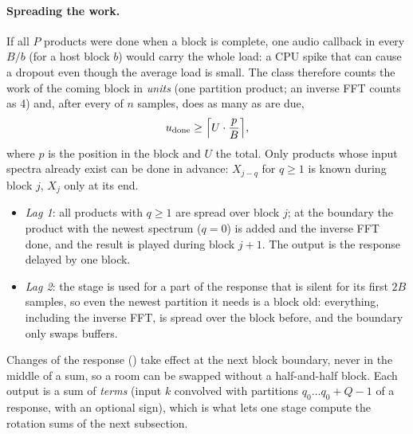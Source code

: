\paragraph{Spreading the work.} If all $P$ products were done when a block is complete, one audio callback in every
$B/b$ (for a host block $b$) would carry the whole load: a CPU spike that can cause a dropout even though the
average load is small. The class therefore counts the work of the coming block in \emph{units} (one partition
product; an inverse FFT counts as 4) and, after every  of $n$ samples, does as many as are due,
\begin{equation}
  u_\mathrm{done} \ge \Bigl\lceil U\cdot\frac{p}{B}\Bigr\rceil ,
\end{equation}
where $p$ is the position in the block and $U$ the total. Only products whose input spectra already exist can be
done in advance: $X_{j-q}$ for $q\ge1$ is known during block $j$, $X_j$ only at its end.
\begin{itemize}[nosep]
  \item \emph{Lag 1}: all products with $q\ge 1$ are spread over block $j$; at the boundary the product with the
    newest spectrum ($q=0$) is added and the inverse FFT done, and the result is played during block $j+1$. The output
    is the response delayed by one block.
  \item \emph{Lag 2}: the stage is used for a part of the response that is silent for its first $2B$ samples, so even
    the newest partition it needs is a block old: everything, including the inverse FFT, is spread over the block
    before, and the boundary only swaps buffers.
\end{itemize}
Changes of the response () take effect at the next block boundary, never in the middle of a sum, so a
room can be swapped without a half-and-half block. Each output is a sum of \emph{terms} (input $k$ convolved with
partitions $q_0\dots q_0+Q-1$ of a response, with an optional sign), which is what lets one stage compute the
rotation sums of the next subsection.

